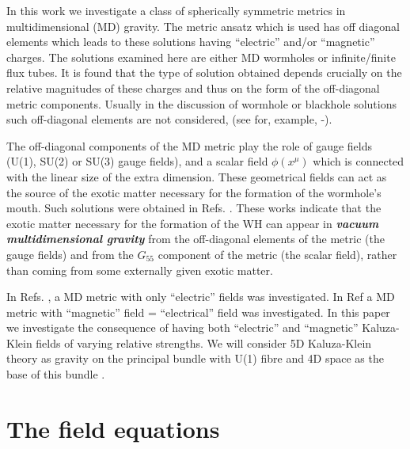In this work we investigate a class of spherically symmetric
metrics in multidimensional (MD) gravity. The metric ansatz which
is used has off diagonal elements which leads to these solutions
having ``electric'' and/or ``magnetic'' charges.
The solutions examined here are either MD wormholes or
infinite/finite flux tubes. It is found that the type of
solution obtained depends crucially on the relative
magnitudes of these charges and thus on the
form of the off-diagonal metric components. Usually in the
discussion of wormhole or blackhole solutions such off-diagonal elements
are not considered, (see for, example, \cite{mor}-\cite{vis}). 
\par 
The off-diagonal components of the MD metric play the role of 
gauge fields (U(1), SU(2) or SU(3) gauge fields), and 
a scalar field $\phi(x^\mu)$ which is connected with the 
linear size of the extra dimension. 
These geometrical fields can act as the source of the 
exotic matter necessary for the formation of
the wormhole's mouth. Such solutions were obtained in Refs.
\cite{chodos} \cite{clem} \cite{dzh1} \cite{dzh2}.
These works indicate that the exotic matter necessary for the
formation of the WH can appear in \textbf{\textit{vacuum multidimensional 
gravity}} from the off-diagonal elements of the metric
(the gauge fields) and from the $G_{55}$ component of the metric
(the scalar field), rather than coming from some externally
given exotic matter.
\par 
In Refs. \cite{dzh1}, \cite{dzh2} a MD metric with
only ``electric'' fields was investigated. In Ref \cite{dzh4}
a MD metric with  ``magnetic'' field = ``electrical'' field  
was investigated.
In this paper we investigate the consequence of having
both ``electric'' and  ``magnetic'' Kaluza-Klein fields of
varying relative strengths. We will consider 5D 
Kaluza-Klein theory as gravity on the principal 
bundle with U(1) fibre and 4D space as the base of this bundle 
\cite{dzh2}. 

\section{The field equations}


